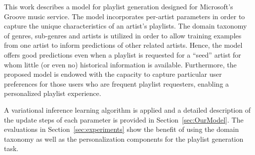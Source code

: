 This work describes a model for playlist generation designed for Microsoft's Groove music service. The model incorporates per-artist parameters in order to capture the unique characteristics of an artist's playlists. The domain taxonomy of genres, sub-genres and artists is utilized in order to allow training examples from one artist to inform predictions of other related artists. Hence, the model offers good predictions even when a playlist is requested for a ``seed'' artist for whom little (or even no) historical information is available. Furthermore, the proposed model is endowed with the capacity to capture particular user preferences for those users who are frequent playlist requesters, enabling a personalized playlist experience. %

A variational inference learning algorithm is applied and a detailed description of the update steps of each parameter is provided in Section~\ref{sec:OurModel}. %
The evaluations in Section~\ref{sec:experiments} show the benefit of using the domain taxonomy as well as the personalization components for the playlist generation task.%


